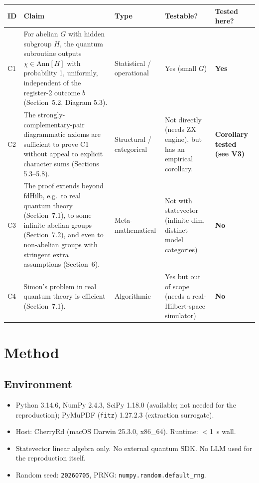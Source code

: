 \documentclass[11pt]{article}
\begin{document}
\begin{longtable}{p{} p{} p{} p{} p{}}
\toprule
ID & Claim & Type & Testable? & Tested here? \\
\midrule
C1 & For abelian $G$ with hidden subgroup $H$, the quantum subroutine outputs $\chi \in \mathrm{Ann}[H]$
     with probability 1, uniformly, independent of the register-2 outcome $b$
     (Section~5.2, Diagram 5.3). & Statistical / operational & Yes (small $G$) & \textbf{Yes} \\
C2 & The strongly-complementary-pair diagrammatic axioms are sufficient to prove C1
     without appeal to explicit character sums (Sections 5.3--5.8). & Structural / categorical & Not directly
     (needs ZX engine), but has an empirical corollary. & \textbf{Corollary tested (see V3)} \\
C3 & The proof extends beyond fdHilb, e.g.\ to real quantum theory (Section~7.1),
     to some infinite abelian groups (Section~7.2), and even to non-abelian groups with
     stringent extra assumptions (Section~6). & Meta-mathematical & Not with statevector
     (infinite dim, distinct model categories) & \textbf{No} \\
C4 & Simon's problem in real quantum theory is efficient (Section~7.1). & Algorithmic & Yes but out
     of scope (needs a real-Hilbert-space simulator) & \textbf{No} \\
\bottomrule
\end{longtable}

\section{Method}

\subsection{Environment}
\begin{itemize}
\item Python 3.14.6, NumPy 2.4.3, SciPy 1.18.0 (available; not needed for the reproduction);
      PyMuPDF (\texttt{fitz}) 1.27.2.3 (extraction surrogate).
\item Host: CherryRd (macOS Darwin 25.3.0, x86\_64). Runtime: $<$1~s wall.
\item Statevector linear algebra only. No external quantum SDK. No LLM used for the reproduction itself.
\item Random seed: \texttt{20260705}, PRNG: \texttt{numpy.random.default\_rng}.
\end{itemize}
\end{document}
